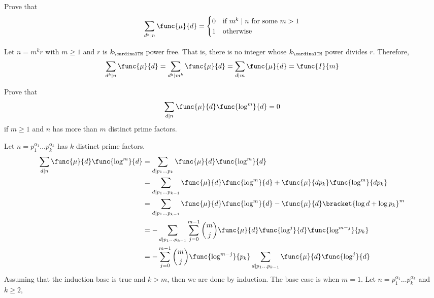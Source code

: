 \begin{exercise}
    \item Prove that 
    \begin{equation*}
        \sum_{d^k \mid n} \func{\mu}{d} = \begin{cases}
            0 & \text{if } m^k \mid n \text{ for some } m > 1\\
            1 & \text{otherwise}
        \end{cases}
    \end{equation*}
    \begin{solution}
        Let \(n = m^k r\) with \(m \geq 1\) and \(r\) is \(k_{\cardinalTH}\) power free. That is, there is no integer whose \(k_{\cardinalTH}\) power divides \(r\). Therefore,
        \begin{equation*}
            \sum_{d^k \mid n} \func{\mu}{d} = \sum_{d^k \mid m^k} \func{\mu}{d} = \sum_{d \mid m} \func{\mu}{d} = \func{I}{m}
        \end{equation*}
    \end{solution}
    \item Prove that 
    \begin{equation*}
        \sum_{d \mid n} \func{\mu}{d} \func{\log^m}{d} = 0
    \end{equation*}
    if \(m \geq 1\) and \(n\) has more than \(m\) distinct prime factors.
    \begin{solution}
        Let \(n = p_1^{\alpha_1} \dots p_k^{\alpha_k}\) has \(k\) distinct prime factors.
        \begin{align*}
            \sum_{d \mid n} \func{\mu}{d} \func{\log^m}{d} &= \sum_{d \mid p_1\dots p_k}\func{\mu}{d} \func{\log^m}{d}\\
            &= \sum_{d \mid p_1\dots p_{k-1}} \func{\mu}{d} \func{\log^m}{d} + \func{\mu}{dp_k} \func{\log^m}{dp_k}\\
            &= \sum_{d \mid p_1\dots p_{k-1}} \func{\mu}{d} \func{\log^m}{d} - \func{\mu}{d} \bracket{\log d + \log p_k}^m\\
            &=- \sum_{d \mid p_1\dots p_{k-1}}\sum_{j = 0}^{m-1} \binom{m}{j} \func{\mu}{d}\func{\log^j}{d} \func{\log^{m-j}}{p_k}\\
            &=- \sum_{j = 0}^{m-1} \binom{m}{j} \func{\log^{m-j}}{p_k}  \sum_{d \mid p_1\dots p_{k-1}} \func{\mu}{d} \func{\log^j}{d} 
        \end{align*}
            Assuming that the induction base is true and \(k > m\), then we are done by induction. The base case is when \(m = 1\). Let \(n = p_1^{\alpha_1} \dots p_k^{\alpha_k}\) and \(k \geq 2\), 

\end{solution}
\end{exercise}
